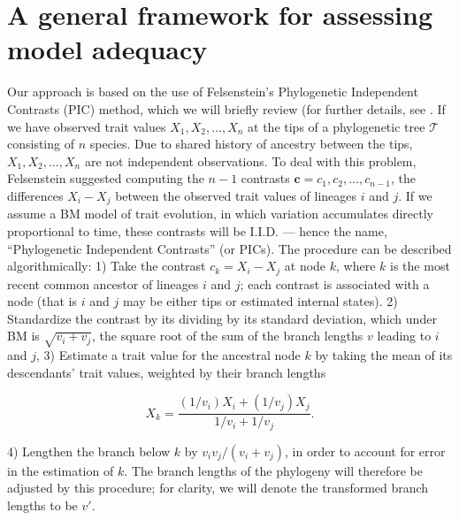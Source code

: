 \documentclass[a4paper,12pt]{article}
\begin{document}
\section{A general framework for assessing model adequacy}
Our approach is based on the use of Felsenstein's \citep{Felsenstein1973, Felsenstein1985} Phylogenetic Independent Contrasts (PIC) method, which we will briefly review (for further details, see \citep{Felsenstein1985, Rohlf2001, Blomberg2012}. If we have observed trait values $X_1, X_2, \ldots, X_n$ at the tips of a phylogenetic tree $\mathcal{T}$ consisting of $n$ species. Due to shared history of ancestry between the tips, $X_1, X_2, \ldots, X_n$ are not independent observations. To deal with this problem, Felsenstein suggested computing the $n-1$ contrasts $\mathbf{c} = c_1, c_2, \ldots, c_{n-1}$, the differences $X_{i} - X_{j}$ between the observed trait values of lineages $i$ and $j$. If we assume a BM model of trait evolution, in which variation accumulates directly proportional to time, these contrasts will be I.I.D. --- hence the name, ``Phylogenetic Independent Contrasts'' (or PICs). The procedure can be described algorithmically: 1) Take the contrast $c_k = X_i - X_j$ at node $k$, where $k$ is the most recent common ancestor of lineages $i$ and $j$; each contrast is associated with a node (that is $i$ and $j$ may be either tips or estimated internal states). 2) Standardize the contrast by its dividing by its standard deviation, which under BM is $\sqrt{v_i + v_j}$, the square root of the sum of the branch lengths $v$ leading to $i$ and $j$, 3) Estimate a trait value for the ancestral node $k$ by taking the mean of its descendants' trait values, weighted by their branch lengths

\begin{equation}
X_k = \frac{(1 / v_i)X_i + (1 / v_j)X_j}{1/v_i + 1/v_j}.
\end{equation}

4) Lengthen the branch below $k$ by $v_i v_j / (v_i + v_j)$, in order to account for error in the estimation of $k$. The branch lengths of the phylogeny will therefore be adjusted by this procedure; for clarity, we will denote the transformed branch lengths to be $v\prime$.
\end{document}
